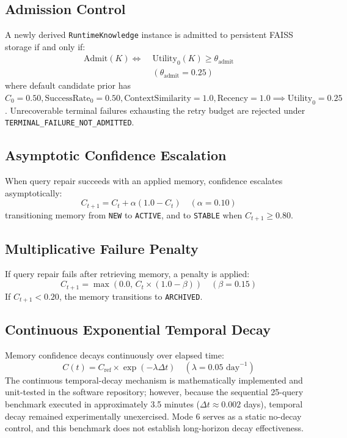 \subsection{Admission Control}
A newly derived \texttt{Runtime\-Knowledge} instance is admitted to persistent FAISS storage if and only if:
\begin{equation}
\begin{aligned}
\text{Admit}(K) \iff \; & \text{Utility}_0(K) \ge \theta_{\text{admit}} \\
& (\theta_{\text{admit}} = 0.25)
\end{aligned}
\end{equation}
where default candidate prior has $C_0 = 0.50, \text{SuccessRate}_0 = 0.50, \text{ContextSimilarity} = 1.0, \text{Recency} = 1.0 \implies \text{Utility}_0 = 0.25$. Unrecoverable terminal failures exhausting the retry budget are rejected under \texttt{TERMINAL\_\allowbreak FAILURE\_\allowbreak NOT\_\allowbreak ADMITTED}.

\subsection{Asymptotic Confidence Escalation}
When query repair succeeds with an applied memory, confidence escalates asymptotically:
\begin{equation}
C_{t+1} = C_t + \alpha (1.0 - C_t) \quad (\alpha = 0.10)
\end{equation}
transitioning memory from \texttt{NEW} to \texttt{ACTIVE}, and to \texttt{STABLE} when $C_{t+1} \ge 0.80$.

\subsection{Multiplicative Failure Penalty}
If query repair fails after retrieving memory, a penalty is applied:
\begin{equation}
C_{t+1} = \max(0.0, \, C_t \times (1.0 - \beta)) \quad (\beta = 0.15)
\end{equation}
If $C_{t+1} < 0.20$, the memory transitions to \texttt{ARCHIVED}.

\subsection{Continuous Exponential Temporal Decay}
Memory confidence decays continuously over elapsed time:
\begin{equation}
C(t) = C_{\text{ref}} \times \exp(-\lambda \Delta t) \quad (\lambda = 0.05 \text{ day}^{-1})
\end{equation}
The continuous temporal-decay mechanism is mathematically implemented and unit-tested in the software repository; however, because the sequential 25-query benchmark executed in approximately 3.5 minutes ($\Delta t \approx 0.002$ days), temporal decay remained experimentally unexercised. Mode 6 serves as a static no-decay control, and this benchmark does not establish long-horizon decay effectiveness.

